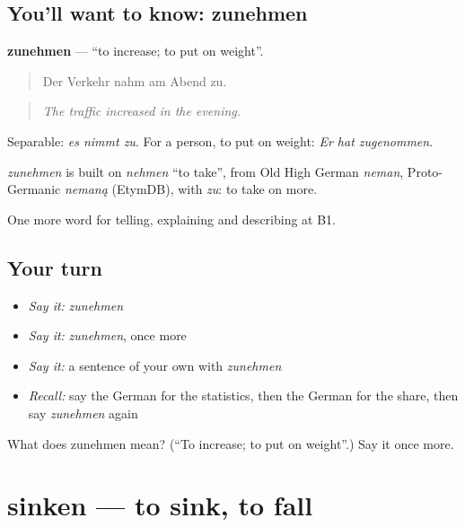 \subsection*{You'll want to know: zunehmen}
\textbf{zunehmen} — \textquotedblleft{}to increase; to put on weight\textquotedblright{}.

\begin{quote}
Der Verkehr nahm am Abend zu.
\end{quote}

\begin{quote}
\emph{The traffic increased in the evening.}
\end{quote}

Separable: \emph{es nimmt zu}. For a person, to put on weight: \emph{Er hat zugenommen}.

\begin{cousinweb}
\emph{zunehmen} is built on \emph{nehmen} \textquotedblleft{}to take\textquotedblright{}, from Old High German \emph{neman}, Proto-Germanic \emph{nemaną} (EtymDB), with \emph{zu}: to take on more.
\end{cousinweb}

\begin{grammarlens}[title={What you've built}]
One more word for telling, explaining and describing at B1.
\end{grammarlens}

\subsection*{Your turn}
\begin{itemize}
\raggedright
  \item \emph{Say it:} \emph{zunehmen}
  \item \emph{Say it:} \emph{zunehmen}, once more
  \item \emph{Say it:} a sentence of your own with \emph{zunehmen}
  \item \emph{Recall:} say the German for the statistics, then the German for the share, then say \emph{zunehmen} again
\end{itemize}

\begin{tcolorbox}[breakable,colback=teal!4,colframe=teal!35!black,title={Before you move on}]
What does zunehmen mean? (\textquotedblleft{}To increase; to put on weight\textquotedblright{}.) Say it once more.
\end{tcolorbox}
\section[sinken]{sinken — to sink, to fall}

